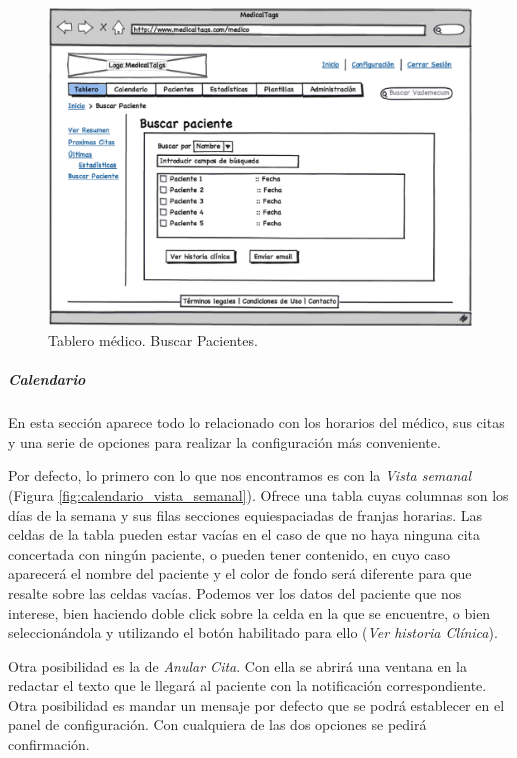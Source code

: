 			\begin{figure}[H]
			  \centering
			    \includegraphics[width=12cm]{img/eps/11_Dashboard_Medico_Tablero_Paciente.eps}
			  \caption{Tablero médico. Buscar Pacientes.}
			  \label{fig:tablero_medico_pacientes}
			\end{figure}
		
		
		
		\subparagraph{Calendario} %
		\label{par:medico_calendario}
		
			En esta sección aparece todo lo relacionado con los horarios del médico, sus citas y una serie de opciones para realizar la configuración  más conveniente.
			
			Por defecto, lo primero con lo que nos encontramos es con la \textit{Vista semanal} (Figura \ref{fig:calendario_vista_semanal}). Ofrece una tabla cuyas columnas son los días de la semana y sus filas secciones equiespaciadas de franjas horarias. Las celdas de la tabla pueden estar vacías en el caso de que no haya ninguna cita concertada con ningún paciente, o pueden tener contenido, en cuyo caso aparecerá el nombre del paciente y el color de fondo será diferente para que resalte sobre las celdas vacías. Podemos ver los datos del paciente que nos interese, bien haciendo doble click sobre la celda en la que se encuentre, o bien seleccionándola y utilizando el botón habilitado para ello (\textit{Ver historia Clínica}). 
			
			Otra posibilidad es la de \textit{Anular Cita}. Con ella se abrirá una ventana en la redactar el texto que le llegará al paciente con la notificación correspondiente. Otra posibilidad es mandar un mensaje por defecto que se podrá establecer en el panel de configuración. Con cualquiera de las dos opciones se pedirá confirmación.			
			
